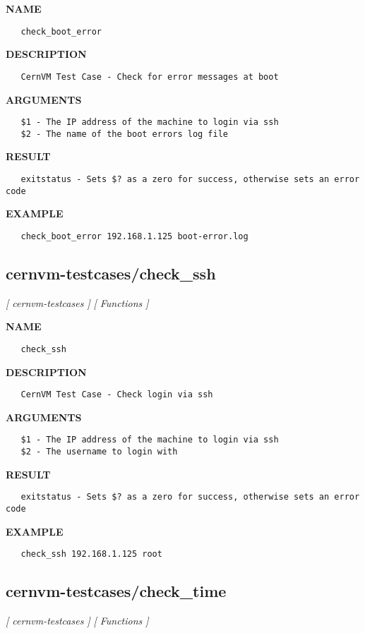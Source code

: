 \label{ch:robo15}
\label{ch:cernvm_testcases_check_boot_error}
\textbf{NAME}
\begin{verbatim}
   check_boot_error
\end{verbatim}
\textbf{DESCRIPTION}
\begin{verbatim}
   CernVM Test Case - Check for error messages at boot
\end{verbatim}
\textbf{ARGUMENTS}
\begin{verbatim}
   $1 - The IP address of the machine to login via ssh
   $2 - The name of the boot errors log file
\end{verbatim}
\textbf{RESULT}
\begin{verbatim}
   exitstatus - Sets $? as a zero for success, otherwise sets an error code
\end{verbatim}
\textbf{EXAMPLE}
\begin{verbatim}
   check_boot_error 192.168.1.125 boot-error.log
\end{verbatim}
\newpage
\subsection{cernvm-testcases/check\_ssh}
\textsl{[ cernvm-testcases ]}
\textsl{[ Functions ]}

\label{ch:robo16}
\label{ch:cernvm_testcases_check_ssh}
\textbf{NAME}
\begin{verbatim}
   check_ssh
\end{verbatim}
\textbf{DESCRIPTION}
\begin{verbatim}
   CernVM Test Case - Check login via ssh
\end{verbatim}
\textbf{ARGUMENTS}
\begin{verbatim}
   $1 - The IP address of the machine to login via ssh
   $2 - The username to login with
\end{verbatim}
\textbf{RESULT}
\begin{verbatim}
   exitstatus - Sets $? as a zero for success, otherwise sets an error code
\end{verbatim}
\textbf{EXAMPLE}
\begin{verbatim}
   check_ssh 192.168.1.125 root
\end{verbatim}
\newpage
\subsection{cernvm-testcases/check\_time}
\textsl{[ cernvm-testcases ]}
\textsl{[ Functions ]}

